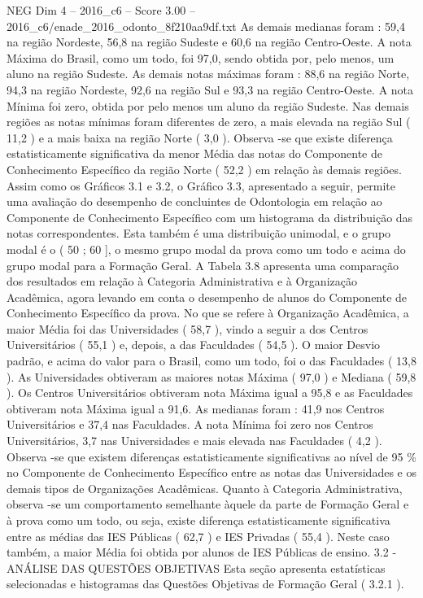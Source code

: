 \begin{textsample}{NEG Dim 4 – 2016\_c6 – Score 3.00 – 2016\_c6/enade\_2016\_odonto\_8f210aa9df.txt}
As demais medianas foram : 59,4 na região Nordeste, 56,8 na região Sudeste e 60,6 na região Centro-Oeste.
A nota Máxima do Brasil, como um todo, foi 97,0, sendo obtida por, pelo menos, um aluno na região Sudeste.
As demais notas máximas foram : 88,6 na região Norte, 94,3 na região Nordeste, 92,6 na região Sul e 93,3 na região Centro-Oeste.
A nota Mínima foi zero, obtida por pelo menos um aluno da região Sudeste.
Nas demais regiões as notas mínimas foram diferentes de zero, a mais elevada na região Sul ( 11,2 ) e a mais baixa na região Norte ( 3,0 ).
Observa -se que existe diferença estatisticamente significativa da menor Média das notas do Componente de Conhecimento Específico da região Norte ( 52,2 ) em relação às demais regiões.
Assim como os Gráficos 3.1 e 3.2, o Gráfico 3.3, apresentado a seguir, permite uma avaliação do desempenho de concluintes de Odontologia em relação ao Componente de Conhecimento Específico com um histograma da distribuição das notas correspondentes.
Esta também é uma distribuição unimodal, e o grupo modal é o ( 50 ; 60 ], o mesmo grupo modal da prova como um todo e acima do grupo modal para a Formação Geral.
A Tabela 3.8 apresenta uma comparação dos resultados em relação à Categoria Administrativa e à Organização Acadêmica, agora levando em conta o desempenho de alunos do Componente de Conhecimento Específico da prova.
No que se refere à Organização Acadêmica, a maior Média foi das Universidades ( 58,7 ), vindo a seguir a dos Centros Universitários ( 55,1 ) e, depois, a das Faculdades ( 54,5 ).
O maior Desvio padrão, e acima do valor para o Brasil, como um todo, foi o das Faculdades ( 13,8 ).
As Universidades obtiveram as maiores notas Máxima ( 97,0 ) e Mediana ( 59,8 ).
Os Centros Universitários obtiveram nota Máxima igual a 95,8 e as Faculdades obtiveram nota Máxima igual a 91,6.
As medianas foram : 41,9 nos Centros Universitários e 37,4 nas Faculdades.
A nota Mínima foi zero nos Centros Universitários, 3,7 nas Universidades e mais elevada nas Faculdades ( 4,2 ).
Observa -se que existem diferenças estatisticamente significativas ao nível de 95 \% no Componente de Conhecimento Específico entre as notas das Universidades e os demais tipos de Organizações Acadêmicas.
Quanto à Categoria Administrativa, observa -se um comportamento semelhante àquele da parte de Formação Geral e à prova como um todo, ou seja, existe diferença estatisticamente significativa entre as médias das IES Públicas ( 62,7 ) e IES Privadas ( 55,4 ).
Neste caso também, a maior Média foi obtida por alunos de IES Públicas de ensino. 3.2 - ANÁLISE DAS QUESTÕES OBJETIVAS Esta seção apresenta estatísticas selecionadas e histogramas das Questões Objetivas de Formação Geral ( 3.2.1 ).

\end{textsample}

